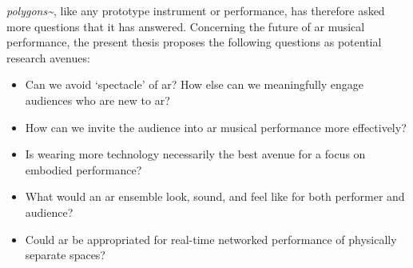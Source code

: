 \textit{polygons\textasciitilde{}}, like any prototype instrument or performance, has therefore asked more questions that it has answered. Concerning the future of \gls{ar} musical performance, the present thesis proposes the following questions as potential research avenues:
\begin{itemize}
    \item Can we avoid `spectacle' of \gls{ar}? How else can we meaningfully engage audiences who are new to \gls{ar}?
    \item How can we invite the audience into \gls{ar} musical performance more effectively?
    \item Is wearing more technology necessarily the best avenue for a focus on embodied performance?
    \item What would an \gls{ar} ensemble look, sound, and feel like for both performer and audience?
    \item Could \gls{ar} be appropriated for real-time networked performance of physically separate spaces?
\end{itemize}